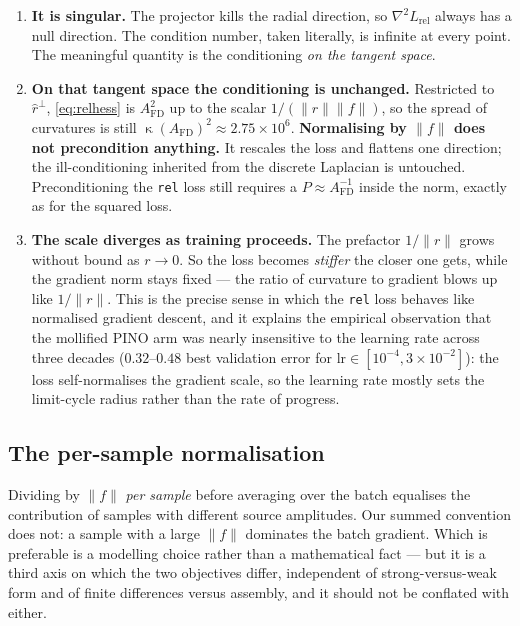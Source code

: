 \documentclass[11pt]{article}
\newcommand{\Afd}{A_{\mathrm{FD}}}
\DeclareMathOperator{\cond}{\kappa}
\begin{document}
\begin{enumerate}
  \item \textbf{It is singular.} The projector kills the radial direction, so
  $\nabla^2 L_{\mathrm{rel}}$ always has a null direction. The condition number, taken literally,
  is infinite at every point. The meaningful quantity is the conditioning \emph{on the tangent
  space}.
  \item \textbf{On that tangent space the conditioning is unchanged.} Restricted to
  $\hat r^\perp$, \eqref{eq:relhess} is $\Afd^2$ up to the scalar $1/(\|r\|\|f\|)$, so the spread
  of curvatures is still $\cond(\Afd)^2 \approx 2.75\times10^{6}$. \textbf{Normalising by $\|f\|$
  does not precondition anything.} It rescales the loss and flattens one direction; the
  ill-conditioning inherited from the discrete Laplacian is untouched. Preconditioning the
  \texttt{rel} loss still requires a $P \approx \Afd^{-1}$ inside the norm, exactly as for the
  squared loss.
  \item \textbf{The scale diverges as training proceeds.} The prefactor $1/\|r\|$ grows without
  bound as $r\to0$. So the loss becomes \emph{stiffer} the closer one gets, while the gradient norm
  stays fixed --- the ratio of curvature to gradient blows up like $1/\|r\|$. This is the precise
  sense in which the \texttt{rel} loss behaves like normalised gradient descent, and it explains
  the empirical observation that the mollified PINO arm was nearly insensitive to the learning rate
  across three decades ($0.32$--$0.48$ best validation error for
  $\mathrm{lr}\in[10^{-4},3\times10^{-2}]$): the loss self-normalises the gradient scale, so the
  learning rate mostly sets the limit-cycle radius rather than the rate of progress.
\end{enumerate}

\subsection{The per-sample normalisation}

Dividing by $\|f\|$ \emph{per sample} before averaging over the batch equalises the contribution of
samples with different source amplitudes. Our summed convention does not: a sample with a large
$\|f\|$ dominates the batch gradient. Which is preferable is a modelling choice rather than a
mathematical fact --- but it is a third axis on which the two objectives differ, independent of
strong-versus-weak form and of finite differences versus assembly, and it should not be conflated
with either.
\end{document}
